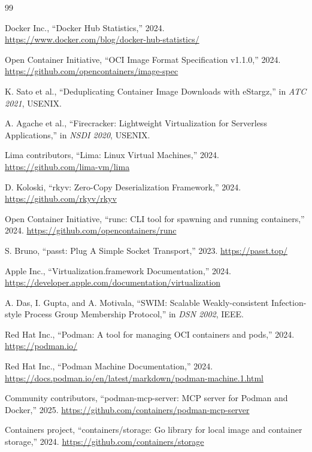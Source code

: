\documentclass[11pt,a4paper]{article}
\begin{document}
\begin{thebibliography}{99}

Docker Inc., ``Docker Hub Statistics,'' 2024.
\url{https://www.docker.com/blog/docker-hub-statistics/}

Open Container Initiative, ``OCI Image Format Specification v1.1.0,'' 2024.
\url{https://github.com/opencontainers/image-spec}

K. Sato et al., ``Deduplicating Container Image Downloads with eStargz,'' in \emph{ATC 2021}, USENIX.

A. Agache et al., ``Firecracker: Lightweight Virtualization for Serverless Applications,'' in \emph{NSDI 2020}, USENIX.

Lima contributors, ``Lima: Linux Virtual Machines,'' 2024.
\url{https://github.com/lima-vm/lima}

D. Koloski, ``rkyv: Zero-Copy Deserialization Framework,'' 2024.
\url{https://github.com/rkyv/rkyv}

Open Container Initiative, ``runc: CLI tool for spawning and running containers,'' 2024.
\url{https://github.com/opencontainers/runc}

S. Bruno, ``passt: Plug A Simple Socket Transport,'' 2023.
\url{https://passt.top/}

Apple Inc., ``Virtualization.framework Documentation,'' 2024.
\url{https://developer.apple.com/documentation/virtualization}

A. Das, I. Gupta, and A. Motivala, ``SWIM: Scalable Weakly-consistent Infection-style Process Group Membership Protocol,'' in \emph{DSN 2002}, IEEE.

Red Hat Inc., ``Podman: A tool for managing OCI containers and pods,'' 2024.
\url{https://podman.io/}

Red Hat Inc., ``Podman Machine Documentation,'' 2024.
\url{https://docs.podman.io/en/latest/markdown/podman-machine.1.html}

Community contributors, ``podman-mcp-server: MCP server for Podman and Docker,'' 2025.
\url{https://github.com/containers/podman-mcp-server}

Containers project, ``containers/storage: Go library for local image and container storage,'' 2024.
\url{https://github.com/containers/storage}


\end{thebibliography}
\end{document}

